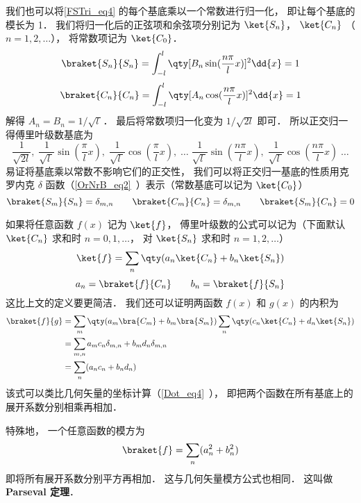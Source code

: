 我们也可以将\autoref{FSTri_eq4} 的每个基底乘以一个常数进行归一化， 即让每个基底的模长为 1． 我们将归一化后的正弦项和余弦项分别记为 $\ket{S_n}$， $\ket{C_n}$ （$n = 1, 2,\dots$）， 将常数项记为 $\ket{C_0}$．
\begin{equation}
\braket{S_n}{S_n} = \int_{-l}^l \qty[B_n \sin(\frac{n\pi}{l}x)]^2 \dd{x} = 1
\end{equation}
\begin{equation}
\braket{C_n}{C_n} = \int_{-l}^l \qty[A_n \cos(\frac{n\pi}{l}x)]^2 \dd{x} = 1
\end{equation}
解得 $A_n = B_n = 1/\sqrt{l\ }$． 最后将常数项归一化变为 $1/\sqrt{2l}$ 即可． 所以正交归一得傅里叶级数基底为
\begin{equation}
\frac{1}{\sqrt{2l}},\;   \frac{1}{\sqrt{l\ }}\sin(\frac{\pi}{l} x),\;   \frac{1}{\sqrt{l\ }}\cos(\frac{\pi}{l} x),\;   \dots\;  \frac{1}{\sqrt{l\ }}\sin(\frac{n\pi}{l} x),\;   \frac{1}{\sqrt{l\ }}\cos(\frac{n\pi}{l} x)\;   \dots
\end{equation}
易证将基底乘以常数不影响它们的正交性， 我们可以将正交归一基底的性质用克罗内克 $\delta$ 函数（\autoref{OrNrB_eq2}~）表示（常数基底可以记为 $\ket{C_0}$）
\begin{equation}
\braket{S_m}{S_n} = \delta_{m,n}
\qquad
\braket{C_m}{C_n} = \delta_{m, n}
\qquad
\braket{S_m}{C_n} = 0
\end{equation}

如果将任意函数 $f(x)$ 记为 $\ket{f}$， 傅里叶级数的公式可以记为（下面默认 $\ket{C_n}$ 求和时 $n = 0, 1, \dots$， 对 $\ket{S_n}$ 求和时 $n = 1, 2, \dots$）
\begin{equation}
\ket{f} = \sum_n \qty(a_n \ket{C_n} + b_n \ket{S_n})
\end{equation}
\begin{equation}
a_n = \braket{f}{C_n}
\qquad
b_n = \braket{f}{S_n}
\end{equation}
这比上文的定义要更简洁． 我们还可以证明两函数 $f(x)$ 和 $g(x)$ 的内积为
\begin{equation}
\begin{aligned}
\braket{f}{g} &= \sum_m \qty(a_m \bra{C_m} + b_m \bra{S_m}) \sum_n \qty(c_n \ket{C_n} + d_n \ket{S_n})\\
&= \sum_{m, n} a_m c_n \delta_{m, n} + b_m d_n \delta_{m, n}\\
&= \sum_n (a_n c_n + b_n d_n)
\end{aligned}
\end{equation}
该式可以类比几何矢量的坐标计算（\autoref{Dot_eq4}~）， 即把两个函数在所有基底上的展开系数分别相乘再相加．

特殊地， 一个任意函数的模方为
\begin{equation}
\braket{f} = \sum_n (a_n^2 + b_n^2)
\end{equation}
即将所有展开系数分别平方再相加． 这与几何矢量模方公式也相同． 这叫做 \textbf{Parseval 定理}．
